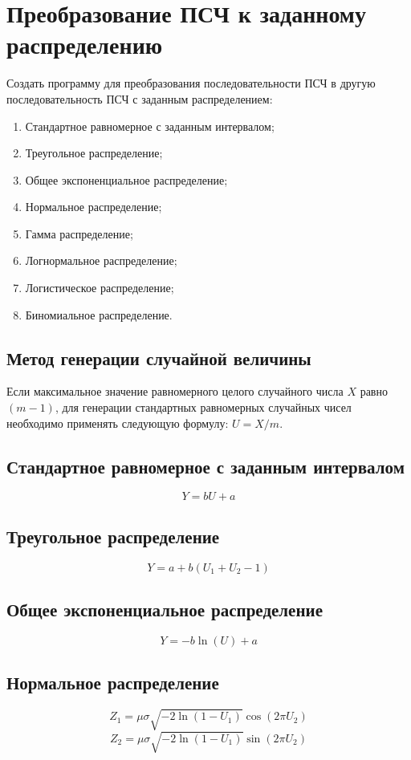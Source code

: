 \documentclass[bachelor, och, labwork]{SCWorks}
\begin{document}
\section{Преобразование ПСЧ к заданному распределению}
Создать программу для преобразования последовательности ПСЧ в другую последовательность
ПСЧ с заданным распределением:
\begin{enumerate}
  \item Стандартное равномерное с заданным интервалом;
  \item Треугольное распределение;
  \item Общее экспоненциальное распределение;
  \item Нормальное распределение;
  \item Гамма распределение;
  \item Логнормальное распределение;
  \item Логистическое распределение;
  \item Биномиальное распределение.
\end{enumerate}

\subsection{Метод генерации случайной величины}
Если максимальное значение равномерного целого случайного числа $X$
равно $(m - 1)$, для генерации стандартных равномерных случайных чисел 
необходимо применять следующую формулу: $U = X / m$.

\subsection{Стандартное равномерное с заданным интервалом}
\[ Y = bU + a \]

\subsection{Треугольное распределение}
\[ Y = a + b(U_1 + U_2 - 1) \]

\subsection{Общее экспоненциальное распределение}
\[ Y = -b \ln(U) + a \]

\subsection{Нормальное распределение}
\[ Z_1 = \mu \sigma \sqrt{-2 \ln(1 - U_1)} \cos(2 \pi U_2) \]
\[ Z_2 = \mu \sigma \sqrt{-2 \ln(1 - U_1)} \sin(2 \pi U_2) \]
\end{document}

